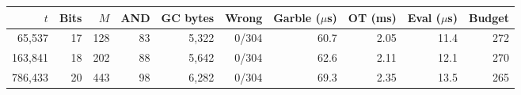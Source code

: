 \begin{tabular}{rrrrrrrrrr}
\hline
$t$ & Bits & $M$ & AND & GC bytes & Wrong & Garble ($\mu$s) & OT (ms) & Eval ($\mu$s) & Budget \\
\hline
65,537 & 17 & 128 & 83 & 5,322 & 0/304 & 60.7 & 2.05 & 11.4 & 272 \\
163,841 & 18 & 202 & 88 & 5,642 & 0/304 & 62.6 & 2.11 & 12.1 & 270 \\
786,433 & 20 & 443 & 98 & 6,282 & 0/304 & 69.3 & 2.35 & 13.5 & 265 \\
\hline
\end{tabular}
